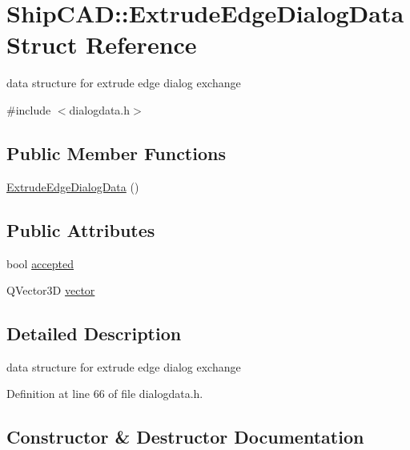 \hypertarget{structShipCAD_1_1ExtrudeEdgeDialogData}{}\section{Ship\+C\+AD\+:\+:Extrude\+Edge\+Dialog\+Data Struct Reference}
\label{structShipCAD_1_1ExtrudeEdgeDialogData}


data structure for extrude edge dialog exchange  




{\ttfamily \#include $<$dialogdata.\+h$>$}

\subsection*{Public Member Functions}
\begin{DoxyCompactItemize}
\item 
\hyperlink{structShipCAD_1_1ExtrudeEdgeDialogData_a412fc868ad680d1d418ea16d9dbbfed1}{Extrude\+Edge\+Dialog\+Data} ()
\end{DoxyCompactItemize}
\subsection*{Public Attributes}
\begin{DoxyCompactItemize}
\item 
bool \hyperlink{structShipCAD_1_1ExtrudeEdgeDialogData_acacc5c53abda4c79c30f52d96de6d1f9}{accepted}
\item 
Q\+Vector3D \hyperlink{structShipCAD_1_1ExtrudeEdgeDialogData_aa1841a8d73ac4887e46f3f2d0712770c}{vector}
\end{DoxyCompactItemize}


\subsection{Detailed Description}
data structure for extrude edge dialog exchange 

Definition at line 66 of file dialogdata.\+h.



\subsection{Constructor \& Destructor Documentation}
